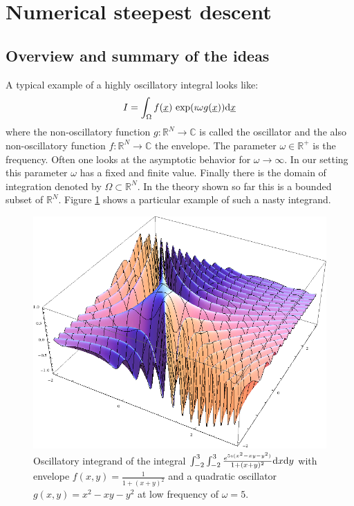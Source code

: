 \documentclass[a4paper,10pt]{article}
\begin{document}
\section{Numerical steepest descent}

\subsection{Overview and summary of the ideas}


A typical example of a highly oscillatory integral looks like:
\begin{equation}
  I = \int_{\Omega} f(\underline{x}) \, \exp(\imath \omega g(\underline{x})) \mathrm{d}\underline{x}
\end{equation}
where the non-oscillatory function $g:\mathbb{R}^N \rightarrow \mathbb{C}$
is called the oscillator and the also non-oscillatory function
$f:\mathbb{R}^N \rightarrow \mathbb{C}$ the envelope. The parameter
$\omega \in \mathbb{R}^{+}$ is the frequency. Often one looks at the
asymptotic behavior for $\omega \rightarrow \infty$. In our setting
this parameter $\omega$ has a fixed and finite value.
Finally there is the domain of integration denoted by $\Omega \subset \mathbb{R}^N$.
In the theory shown so far this is a bounded subset of $\mathbb{R}^N$.
Figure \ref{fig:oscillatory_example_2d} shows a particular
example of such a nasty integrand.

\begin{figure}[h]
  \centering
  \includegraphics[width=0.6\linewidth]{fig/oscillatory_example_2d.png}
  \caption{Oscillatory integrand of the integral
  $\int_{-2}^3 \int_{-2}^3 \frac{e^{5 \imath (x^2-x y-y^2)}}{1 + (x+y)^2} \mathrm{d}x \mathrm{d}y  $
  with envelope $f(x,y) = \frac{1}{1 + (x+y)^2}$ and a quadratic oscillator
  $g(x,y) = x^2 - x y - y^2$ at low frequency of $\omega = 5$.}
  \label{fig:oscillatory_example_2d}
\end{figure}
\end{document}
